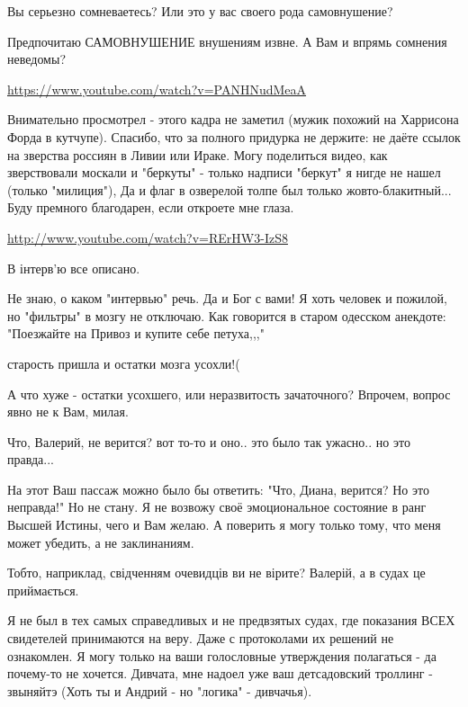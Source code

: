\begin{itemize} %
Вы серьезно сомневаетесь? Или это у вас своего рода самовнушение?

Предпочитаю САМОВНУШЕНИЕ внушениям извне. А Вам и впрямь сомнения неведомы?

\url{https://www.youtube.com/watch?v=PANHNudMeaA}


Внимательно просмотрел - этого кадра не заметил (мужик похожий на Харрисона
Форда в кутчупе). Спасибо, что за полного придурка не держите: не даёте ссылок
на зверства россиян в Ливии или Ираке. Могу поделиться видео, как зверствовали
москали и "беркуты" - только надписи "беркут" я нигде не нашел (только
"милиция"), Да и флаг в озверелой толпе был только жовто-блакитный... Буду
премного благодарен, если откроете мне глаза.

\url{http://www.youtube.com/watch?v=RErHW3-IzS8}

В інтерв'ю все описано.


Не знаю, о каком "интервью" речь. Да и Бог с вами! Я хоть человек и пожилой, но
"фильтры" в мозгу не отключаю. Как говорится в старом одесском анекдоте:
"Поезжайте на Привоз и купите себе петуха,,,"

старость пришла и остатки мозга усохли!(

А что хуже - остатки усохшего, или неразвитость зачаточного? Впрочем, вопрос явно не к Вам, милая.

Что, Валерий, не верится? вот то-то и оно.. это было так ужасно.. но это правда...


На этот Ваш пассаж можно было бы ответить: "Что, Диана, верится? Но это
неправда!" Но не стану. Я не возвожу своё эмоциональное состояние в ранг Высшей
Истины, чего и Вам желаю. А поверить я могу только тому, что меня может
убедить, а не заклинаниям.


Тобто, наприклад, свідченням очевидців ви не вірите? Валерій, а в судах це
приймається.


Я не был в тех самых справедливых и не предвзятых судах, где показания ВСЕХ
свидетелей принимаются на веру. Даже с протоколами их решений не ознакомлен. Я
могу только на ваши голословные утверждения полагаться - да почему-то не
хочется. Дивчата, мне надоел уже ваш детсадовский троллинг - звыняйтэ (Хоть ты
и Андрий - но "логика" - дивчачья).


\end{itemize}
